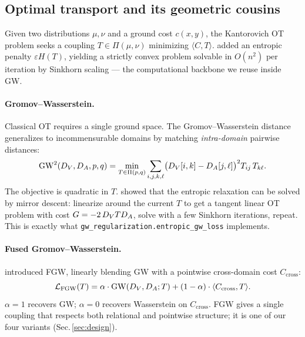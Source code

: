 \subsection{Optimal transport and its geometric cousins}
Given two distributions $\mu, \nu$ and a ground cost $c(x,y)$,
the Kantorovich OT problem seeks a coupling $T \in \Pi(\mu,\nu)$
minimizing $\langle C, T \rangle$.
\citet{cuturi2013sinkhorn} added an entropic penalty
$\varepsilon H(T)$, yielding a strictly convex problem solvable
in $O(n^2)$ per iteration by Sinkhorn scaling --- the
computational backbone we reuse inside GW.

\paragraph{Gromov--Wasserstein.} Classical OT requires a single
ground space. The Gromov--Wasserstein distance
\citep{memoli2011gw,peyre2016gromov,peyre2019computational}
generalizes to incommensurable domains by matching
\emph{intra-domain} pairwise distances:
\begin{equation}
\label{eq:gw}
  \mathrm{GW}^2(D_{V}, D_{A}, p, q) =
    \min_{T \in \Pi(p,q)}
    \sum_{i,j,k,\ell}
    \bigl( D_{V}[i,k] - D_{A}[j,\ell] \bigr)^{2}
    T_{ij}\, T_{k\ell}.
\end{equation}
The objective is quadratic in $T$. \citet{peyre2016gromov}
showed that the entropic relaxation can be solved by mirror
descent: linearize around the current $T$ to get a tangent
linear OT problem with cost $G = -2\, D_{V} T D_{A}$, solve with a
few Sinkhorn iterations, repeat. This is exactly what
\texttt{gw\_regularization.entropic\_gw\_loss} implements.

\paragraph{Fused Gromov--Wasserstein.}
\citet{vayer2020fused} introduced FGW, linearly blending GW with
a pointwise cross-domain cost $C_{\text{cross}}$:
\begin{equation}
\label{eq:fgw}
  \mathcal{L}_{\mathrm{FGW}}(T) = \alpha \cdot \mathrm{GW}(D_{V}, D_{A}; T)
    + (1-\alpha) \cdot \langle C_{\text{cross}}, T \rangle.
\end{equation}
$\alpha = 1$ recovers GW; $\alpha = 0$ recovers Wasserstein on
$C_{\text{cross}}$. FGW gives a single coupling that respects
both relational and pointwise structure; it is one of our four
variants (Sec.\,\ref{sec:design}).

